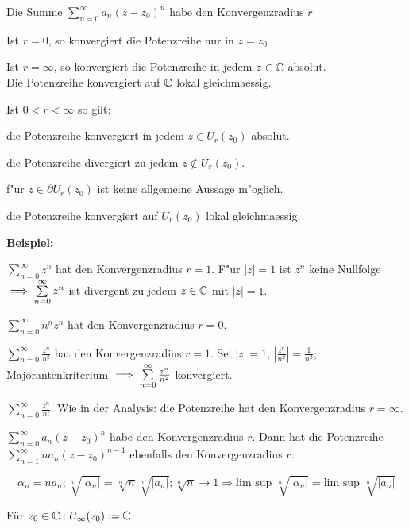 \documentclass[a4paper,twoside,DIV15,BCOR12mm]{scrbook}
\begin{document}
\begin{satz}
Die Summe $  \sum\limits_{n=0}^\infty a_n(z-z_0)^n \text{ habe den Konvergenzradius } r$\\
\begin{liste}
 \item Ist $r=0$, so konvergiert die Potenzreihe nur in $z=z_0$
 \item Ist $r=\infty$, so konvergiert die Potenzreihe in jedem $z\in\mathbb{C}$ absolut. \\
  Die Potenzreihe konvergiert auf $\mathbb{C}$ lokal gleichmaessig.
 \item Ist $0<r<\infty$ so gilt: 
  \begin{liste}
   \item die Potenzreihe konvergiert in jedem $z\in U_r(z_0)$ absolut.
   \item die Potenzreihe divergiert zu jedem $z \not\in \overline{U_r(z_0)}$.
   \item f"ur $z\in \partial U_r(z_0)$ ist keine allgemeine Aussage m"oglich.
   \item die Potenzreihe konvergiert auf $U_r(z_0)$ lokal gleichmaessig.
  \end{liste}
\end{liste}
\end{satz}
\textbf{Beispiel:}\\
 \begin{liste}
  \item $ \sum\limits_{n=0}^\infty z^n $ hat den Konvergenzradius $r=1$. F"ur $|z|=1$ ist $z^n$ keine Nullfolge $ \implies \sum\limits_{n=0}^\infty z^n $ ist divergent zu jedem $z\in\mathbb{C}$ mit $|z|=1$.
  \item $ \sum\limits_{n=0}^\infty n^n z^n $ hat den Konvergenzradius $r=0$.
  \item $ \sum\limits_{n=0}^\infty \frac{z^n}{n^2}$ hat den Konvergenzradius $r=1$. Sei $|z|=1$, $|\frac{z^n}{n^2}|=\frac{1}{n^2}$; Majorantenkriterium $\implies \sum\limits_{n=0}^\infty \frac{z^n}{n^2}$ konvergiert.
  \item $ \sum\limits_{n=0}^\infty \frac{z^n}{n!}$. Wie in der Analysis: die Potenzreihe hat den Konvergenzradius $r=\infty$.
 \end{liste}

\begin{satz}
$\sum\limits_{n=0}^{\infty} a_n(z-z_0)^n$ habe den Konvergenzradius $r$. 
Dann hat die Potenzreihe $\sum\limits_{n=1}^{\infty} na_n(z-z_0)^{n-1}$ ebenfalls den Konvergenzradius $r$.
\end{satz}
\begin{beweis}
\[\alpha_n = n a_n; \sqrt[n]{|\alpha_n|} = \sqrt[n]{n}\sqrt[n]{|a_n|}; \sqrt[n]{n} \to 1 
\Rightarrow \text{lim sup } \sqrt[n]{|\alpha_n|} = \text{lim sup } \sqrt[n]{|a_n|} \]
\end{beweis}
\begin{definition}
Für $z_0 \in \mathbb{C}: U_{\infty}(z_0) := \mathbb{C}$.
\end{definition}
\end{document}
